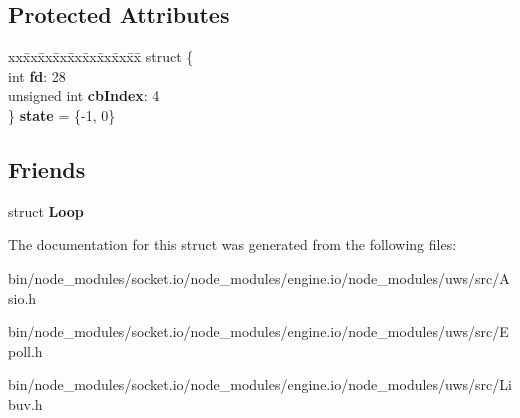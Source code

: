 \subsection*{Protected Attributes}
\begin{DoxyCompactItemize}
\item 
\mbox{\label{struct_poll_a69e3da91d4536a6fcd81e385a46badad}} 
\begin{tabbing}
xx\=xx\=xx\=xx\=xx\=xx\=xx\=xx\=xx\=\kill
struct \{\\
\>int {\bfseries fd}: 28\\
\>unsigned int {\bfseries cbIndex}: 4\\
\} {\bfseries state} = \{-\/1, 0\}\\

\end{tabbing}\end{DoxyCompactItemize}
\subsection*{Friends}
\begin{DoxyCompactItemize}
\item 
\mbox{\label{struct_poll_acf1b6f7eea81ff820e64b77581772ed6}} 
struct {\bfseries Loop}
\end{DoxyCompactItemize}


The documentation for this struct was generated from the following files\+:\begin{DoxyCompactItemize}
\item 
bin/node\+\_\+modules/socket.\+io/node\+\_\+modules/engine.\+io/node\+\_\+modules/uws/src/Asio.\+h\item 
bin/node\+\_\+modules/socket.\+io/node\+\_\+modules/engine.\+io/node\+\_\+modules/uws/src/Epoll.\+h\item 
bin/node\+\_\+modules/socket.\+io/node\+\_\+modules/engine.\+io/node\+\_\+modules/uws/src/Libuv.\+h\end{DoxyCompactItemize}
